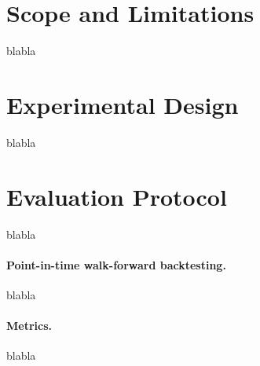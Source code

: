 \section{Scope and Limitations}
blabla

\section{Experimental Design}
blabla

\section{Evaluation Protocol}
blabla

\paragraph{Point-in-time walk-forward backtesting.}
blabla

\paragraph{Metrics.}
blabla